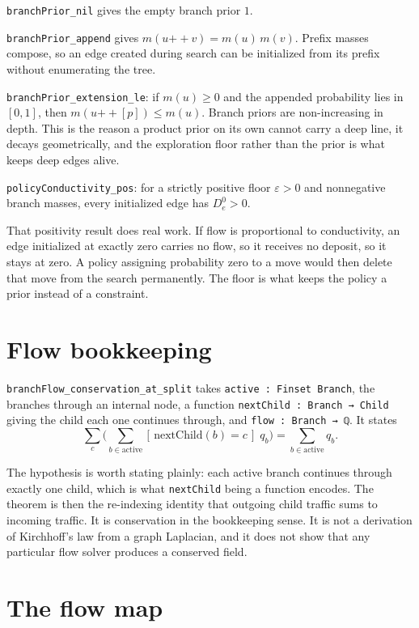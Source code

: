 \documentclass[11pt,a4paper]{article}
\theoremstyle{definition}
\newcommand{\lean}[1]{\texttt{#1}}
\begin{document}
\lean{branchPrior\_nil} gives the empty branch prior $1$.

\lean{branchPrior\_append} gives $m(u \mathbin{+\!\!+} v) = m(u)\, m(v)$. Prefix
masses compose, so an edge created during search can be initialized from its
prefix without enumerating the tree.

\lean{branchPrior\_extension\_le}: if $m(u) \ge 0$ and the appended probability
lies in $[0,1]$, then $m(u \mathbin{+\!\!+} [p]) \le m(u)$. Branch priors are
non-increasing in depth. This is the reason a product prior on its own cannot
carry a deep line, it decays geometrically, and the exploration floor rather
than the prior is what keeps deep edges alive.

\lean{policyConductivity\_pos}: for a strictly positive floor $\varepsilon > 0$
and nonnegative branch masses, every initialized edge has $D_e^0 > 0$.

That positivity result does real work. If flow is proportional to conductivity,
an edge initialized at exactly zero carries no flow, so it receives no deposit,
so it stays at zero. A policy assigning probability zero to a move would then
delete that move from the search permanently. The floor is what keeps the
policy a prior instead of a constraint.

\section{Flow bookkeeping}

\lean{branchFlow\_conservation\_at\_split} takes \lean{active : Finset Branch},
the branches through an internal node, a function
\lean{nextChild : Branch → Child} giving the child each one continues through,
and \lean{flow : Branch → ℚ}. It states
\begin{equation}
  \sum_{c} \Bigg( \sum_{b \in \mathrm{active}}
  [\, \mathrm{nextChild}(b) = c \,] \; q_b \Bigg)
  = \sum_{b \in \mathrm{active}} q_b .
\end{equation}

The hypothesis is worth stating plainly: each active branch continues through
exactly one child, which is what \lean{nextChild} being a function encodes.
The theorem is then the re-indexing identity that outgoing child traffic sums
to incoming traffic. It is conservation in the bookkeeping sense. It is not a
derivation of Kirchhoff's law from a graph Laplacian, and it does not show that
any particular flow solver produces a conserved field.

\section{The flow map}
\label{sec:flowmap}
\end{document}
